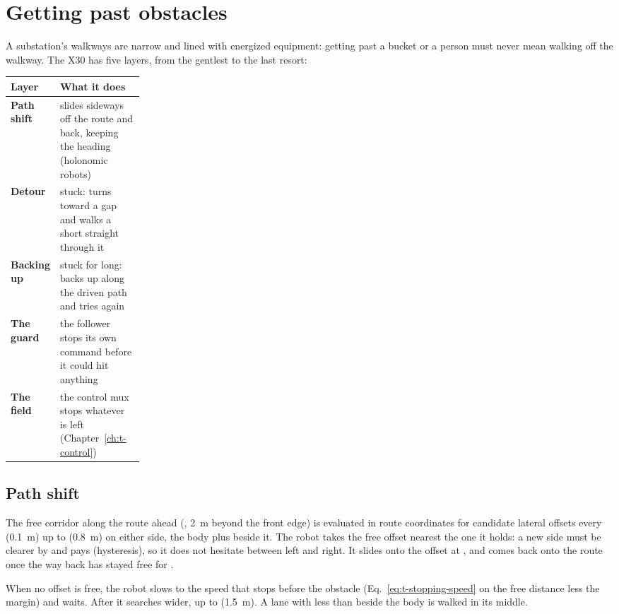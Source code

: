 \chapter{Getting past obstacles}
\label{ch:t-obstacles}

A substation's walkways are narrow and lined with energized equipment: getting past a bucket or a
person must never mean walking off the walkway. The X30 has five layers, from the gentlest to the
last resort:

\begin{center}
\begin{tabularx}{\linewidth}{@{}>{\bfseries}p{0.22\linewidth}X@{}}
  \toprule
  Layer & What it does \\
  \midrule
  Path shift & slides sideways off the route and back, keeping the heading (holonomic robots) \\
  Detour & stuck: turns toward a gap and walks a short straight through it \\
  Backing up & stuck for long: backs up along the driven path and tries again \\
  The guard & the follower stops its own command before it could hit anything \\
  The field & the control mux stops whatever is left (Chapter~\ref{ch:t-control}) \\
  \bottomrule
\end{tabularx}
\end{center}

\section{Path shift}

The free corridor along the route ahead (, \SI{2}{m} beyond the front edge) is
evaluated in route coordinates for candidate lateral offsets every  (\SI{0.1}{m}) up to
 (\SI{0.8}{m}) on either side, the body plus  beside it. The
robot takes the free offset nearest the one it holds: a new side must be clearer by
 and pays  (hysteresis), so it does not hesitate between
left and right. It slides onto the offset at , and comes back onto the route once
the way back has stayed free for .

When no offset is free, the robot slows to the speed that stops  before the
obstacle (Eq.~\ref{eq:t-stopping-speed} on the free distance less the margin) and waits. After
 it searches wider, up to  (\SI{1.5}{m}). A lane with less
than  beside the body is walked in its middle.

